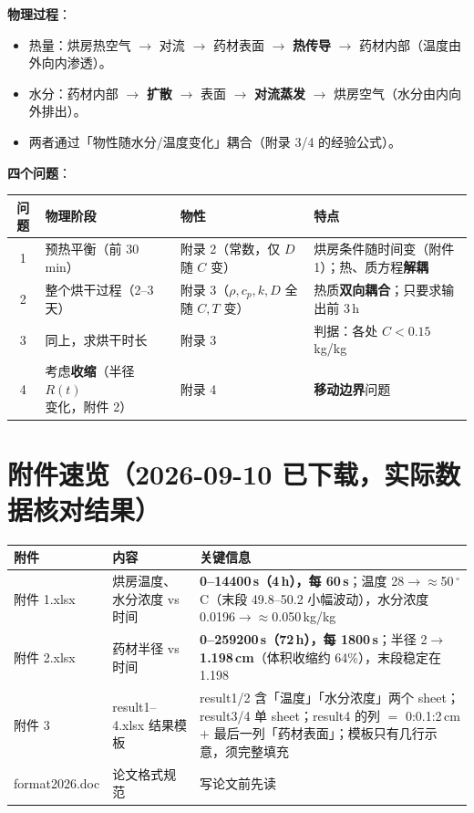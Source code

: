 \documentclass[12pt,a4paper]{ctexart}
\begin{document}
\textbf{物理过程}：
\begin{itemize}[leftmargin=2.5em]
\item 热量：烘房热空气 $\to$ 对流 $\to$ 药材表面 $\to$ \textbf{热传导} $\to$ 药材内部（温度由外向内渗透）。
\item 水分：药材内部 $\to$ \textbf{扩散} $\to$ 表面 $\to$ \textbf{对流蒸发} $\to$ 烘房空气（水分由内向外排出）。
\item 两者通过「物性随水分/温度变化」耦合（附录 3/4 的经验公式）。
\end{itemize}

\textbf{四个问题}：

\begin{center}
\begin{tabular}{clll}
\toprule
问题 & 物理阶段 & 物性 & 特点 \\
\midrule
1 & 预热平衡（前 30\,min） & 附录 2（常数，仅 $D$ 随 $C$ 变） & 烘房条件随时间变（附件 1）；热、质方程\textbf{解耦} \\
2 & 整个烘干过程（2--3 天） & 附录 3（$\rho,c_p,k,D$ 全随 $C,T$ 变） & 热质\textbf{双向耦合}；只要求输出前 3\,h \\
3 & 同上，求烘干时长 & 附录 3 & 判据：各处 $C<0.15$\,kg/kg \\
4 & 考虑\textbf{收缩}（半径 $R(t)$ 变化，附件 2） & 附录 4 & \textbf{移动边界}问题 \\
\bottomrule
\end{tabular}
\end{center}

\section*{附件速览（2026-09-10 已下载，实际数据核对结果）}

\begin{center}
\begin{tabular}{p{2.2cm}p{2.2cm}p{9.6cm}}
\toprule
附件 & 内容 & 关键信息 \\
\midrule
附件 1.xlsx & 烘房温度、水分浓度 vs 时间 & \textbf{0--14400\,s（4\,h），每 60\,s}；温度 28$\to\approx$50\,$^\circ$C（末段 49.8--50.2 小幅波动），水分浓度 0.0196$\to\approx$0.050\,kg/kg \\
附件 2.xlsx & 药材半径 vs 时间 & \textbf{0--259200\,s（72\,h），每 1800\,s}；半径 2$\to$\textbf{1.198\,cm}（体积收缩约 64\%），末段稳定在 1.198 \\
附件 3 & result1--4.xlsx 结果模板 & result1/2 含「温度」「水分浓度」两个 sheet；result3/4 单 sheet；result4 的列 $=$ 0:0.1:2\,cm $+$ 最后一列「药材表面」；模板只有几行示意，须完整填充 \\
format2026.doc & 论文格式规范 & 写论文前先读 \\
\bottomrule
\end{tabular}
\end{center}
\end{document}
